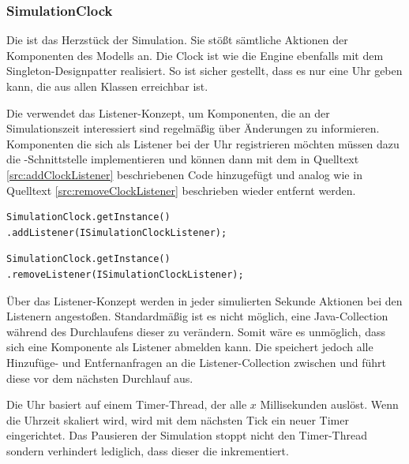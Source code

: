 \subsubsection{SimulationClock}
Die  ist das Herzstück der Simulation. Sie stößt sämtliche Aktionen der Komponenten des Modells an. Die Clock ist wie die Engine ebenfalls mit dem Singleton-Designpatter realisiert. So ist sicher gestellt, dass es nur eine Uhr geben kann, die aus allen Klassen erreichbar ist.

Die  verwendet das Listener-Konzept, um Komponenten, die an der Simulationszeit interessiert sind regelmäßig über Änderungen zu informieren. Komponenten die sich als Listener bei der Uhr registrieren möchten müssen dazu die -Schnittstelle implementieren und können dann mit dem in Quelltext \ref{src:addClockListener} beschriebenen Code hinzugefügt und analog wie in Quelltext \ref{src:removeClockListener} beschrieben wieder entfernt werden.

\begin{illfloat}
  \begin{lstlisting}
SimulationClock.getInstance()
.addListener(ISimulationClockListener);
  \end{lstlisting}
\label{src:addClockListener}
\end{illfloat}
\begin{illfloat}
\begin{lstlisting}
SimulationClock.getInstance()
.removeListener(ISimulationClockListener);
\end{lstlisting}
\label{src:removeClockListener}
\end{illfloat}

Über das Listener-Konzept werden in jeder simulierten Sekunde Aktionen bei den Listenern angestoßen. Standardmäßig ist es nicht möglich, eine Java-Collection während des Durchlaufens dieser zu verändern. Somit wäre es unmöglich, dass sich eine Komponente als Listener abmelden kann. Die  speichert jedoch alle Hinzufüge- und Entfernanfragen an die Listener-Collection zwischen und führt diese vor dem nächsten Durchlauf aus.

Die Uhr basiert auf einem Timer-Thread, der alle $x$ Millisekunden auslöst. Wenn die Uhrzeit skaliert wird, wird mit dem nächsten Tick ein neuer Timer eingerichtet. Das Pausieren der Simulation stoppt nicht den Timer-Thread sondern verhindert lediglich, dass dieser die  inkrementiert.


